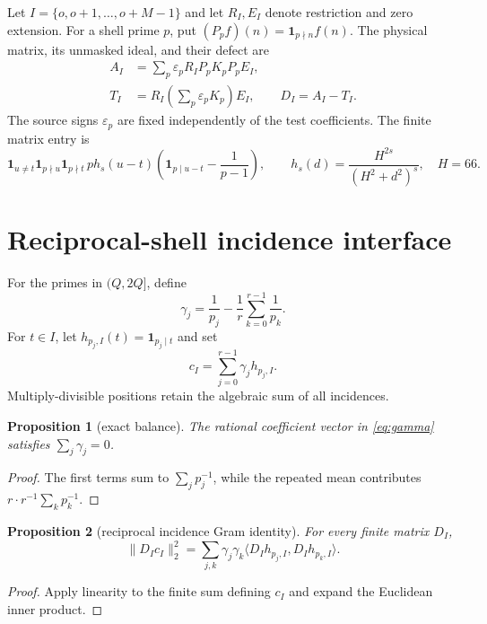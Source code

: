 \documentclass[10pt]{article}
\newtheorem{proposition}{Proposition}
\begin{document}
Let $I=\{o,o+1,\ldots,o+M-1\}$ and let $R_I,E_I$ denote restriction and zero
extension.  For a shell prime $p$, put
$(P_pf)(n)=\mathbf 1_{p\nmid n}f(n)$.  The physical matrix, its unmasked ideal,
and their defect are
\begin{align*}
 A_I&=\sum_p\varepsilon_pR_IP_pK_pP_pE_I,\\
 T_I&=R_I\left(\sum_p\varepsilon_pK_p\right)E_I,
 \qquad D_I=A_I-T_I.
\end{align*}
The source signs $\varepsilon_p$ are fixed independently of the test
coefficients.  The finite matrix entry is
\[
 \mathbf 1_{u\ne t}\mathbf 1_{p\nmid u}\mathbf 1_{p\nmid t}\,p h_s(u-t)
 \left(\mathbf 1_{p\mid u-t}-\frac1{p-1}\right),
 \qquad h_s(d)=\frac{H^{2s}}{(H^2+d^2)^s},\quad H=66.
\]

\section{Reciprocal-shell incidence interface}

For the primes in $(Q,2Q]$, define
\begin{equation}
 \gamma_j=\frac1{p_j}-\frac1r\sum_{k=0}^{r-1}\frac1{p_k}.
 \label{eq:gamma}
\end{equation}
For $t\in I$, let $h_{p_j,I}(t)=\mathbf 1_{p_j\mid t}$ and set
\[
 c_I=\sum_{j=0}^{r-1}\gamma_jh_{p_j,I}.
\]
Multiply-divisible positions retain the algebraic sum of all incidences.

\begin{proposition}[exact balance]
The rational coefficient vector in \eqref{eq:gamma} satisfies
$\sum_j\gamma_j=0$.
\end{proposition}
\begin{proof}
The first terms sum to $\sum_jp_j^{-1}$, while the repeated mean contributes
$r\cdot r^{-1}\sum_kp_k^{-1}$.
\end{proof}

\begin{proposition}[reciprocal incidence Gram identity]
For every finite matrix $D_I$,
\begin{equation}
 \|D_Ic_I\|_2^2=\sum_{j,k}\gamma_j\gamma_k
 \langle D_Ih_{p_j,I},D_Ih_{p_k,I}\rangle.
 \label{eq:gram}
\end{equation}
\end{proposition}
\begin{proof}
Apply linearity to the finite sum defining $c_I$ and expand the Euclidean
inner product.
\end{proof}
\end{document}
